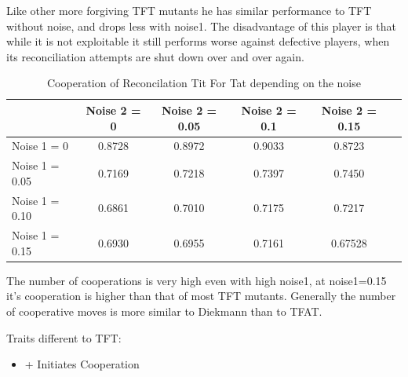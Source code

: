 Like other more forgiving TFT mutants he has similar performance to TFT without noise, and drops less with noise1. The disadvantage of this player is that while it is not exploitable it still performs worse against defective players, when its reconciliation attempts are shut down over and over again.

\begin{table}[h]
 \begin{center}
\caption{Cooperation of Reconcilation Tit For Tat depending on the noise} \vspace{3mm}
\begin{tabular}{|l|c|c|c|c|c|}
\hline
   	& Noise 2 = 0 & Noise 2 = 0.05& Noise 2 = 0.1& Noise 2 = 0.15 \\
  \hline
  Noise 1 = 0 	&  0.8728  &  0.8972  &  0.9033 &   0.8723 \\
 \hline
  Noise 1 = 0.05	 &       0.7169 &   0.7218  &  0.7397 &   0.7450 \\
 \hline
  Noise 1 = 0.10 	&       0.6861 &   0.7010 &   0.7175  &  0.7217 \\
 \hline
  Noise 1 = 0.15 	&      0.6930 &   0.6955  &  0.7161  &  0.67528 \\
 \hline
\end{tabular}
 \end{center}
\end{table}

The number of cooperations is very high even with high noise1, at noise1=0.15 it's cooperation is higher than that of most TFT mutants. Generally the number of cooperative moves is more similar to Diekmann than to TFAT.

Traits different to TFT:

\renewcommand{\labelitemi}{}
\begin{itemize}
	\item + Initiates Cooperation
\end{itemize}
\renewcommand{\labelitemi}{$\bullet$}
 
